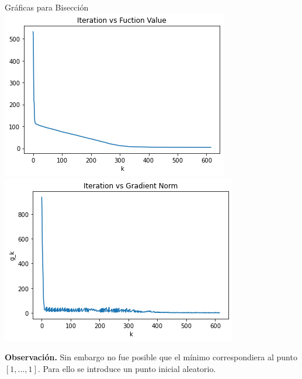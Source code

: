 \documentclass[11pt,letterpaper]{article}
\theoremstyle{definition}
\theoremstyle{definition}
\theoremstyle{definition}
\begin{document}
\begin{center}
	\\
	Gráficas para Bisección
	\\
	\includegraphics[width=0.8\linewidth]{graficas/rosembrock_bisection_100f}
	\\
	\includegraphics[width=0.8\linewidth]{graficas/rosembrock_bisection_100g}
\end{center}
\textbf{Observación.} Sin embargo no fue posible que el mínimo correspondiera al punto $ [1,\dots, 1] $. Para ello se introduce un punto inicial aleatorio.
\end{document}
